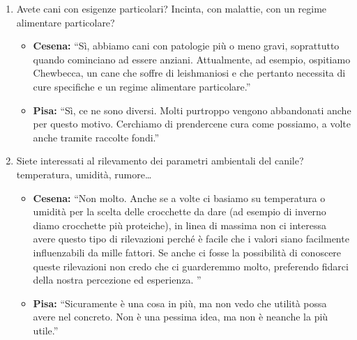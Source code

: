 \documentclass{report}
\begin{document}
\begin{enumerate}
\def\labelenumi{\arabic{enumi}.}
\item
  Avete cani con esigenze particolari? Incinta, con malattie, con un
  regime alimentare particolare?

  \begin{itemize}
  \tightlist
  \item
    \textbf{Cesena:} ``Sì, abbiamo cani con patologie più o meno gravi,
    soprattutto quando cominciano ad essere anziani. Attualmente, ad
    esempio, ospitiamo Chewbecca, un cane che soffre di leishmaniosi e
    che pertanto necessita di cure specifiche e un regime alimentare
    particolare.''
  \item
    \textbf{Pisa: }``Sì, ce ne sono diversi. Molti purtroppo vengono
    abbandonati anche per questo motivo. Cerchiamo di prendercene cura
    come possiamo, a volte anche tramite raccolte fondi.''
  \end{itemize}
\item
  Siete interessati al rilevamento dei parametri ambientali del canile?
  temperatura, umidità, rumore\ldots{}

  \begin{itemize}
  \tightlist
  \item
    \textbf{Cesena:} ``Non molto. Anche se a volte ci basiamo su
    temperatura o umidità per la scelta delle crocchette da dare (ad
    esempio di inverno diamo crocchette più proteiche), in linea di
    massima non ci interessa avere questo tipo di rilevazioni perché è
    facile che i valori siano facilmente influenzabili da mille fattori.
    Se anche ci fosse la possibilità di conoscere queste rilevazioni non
    credo che ci guarderemmo molto, preferendo fidarci della nostra
    percezione ed esperienza. ''
  \item
    \textbf{Pisa: }``Sicuramente è una cosa in più, ma non vedo che
    utilità possa avere nel concreto. Non è una pessima idea, ma non è
    neanche la più utile.''
  \end{itemize}
\end{enumerate}
\end{document}
